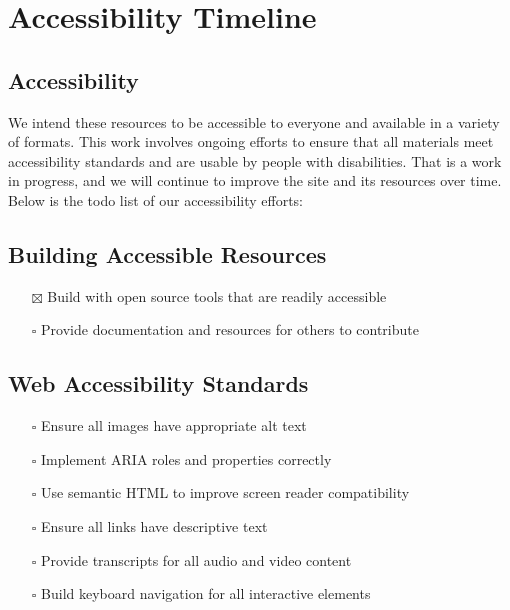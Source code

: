 \section{Accessibility Timeline}\label{accessibility-timeline}

\subsection{Accessibility}\label{accessibility}

We intend these resources to be accessible to everyone and available in
a variety of formats. This work involves ongoing efforts to ensure that
all materials meet accessibility standards and are usable by people with
disabilities. That is a work in progress, and we will continue to
improve the site and its resources over time. Below is the todo list of
our accessibility efforts:

\subsection{Building Accessible
Resources}\label{building-accessible-resources}

\begin{itemize}
\tightlist
\item[$\boxtimes$]
  Build with open source tools that are readily accessible
\item[$\square$]
  Provide documentation and resources for others to contribute
\end{itemize}

\subsection{Web Accessibility
Standards}\label{web-accessibility-standards}

\begin{itemize}
\tightlist
\item[$\square$]
  Ensure all images have appropriate alt text
\item[$\square$]
  Implement ARIA roles and properties correctly
\item[$\square$]
  Use semantic HTML to improve screen reader compatibility
\item[$\square$]
  Ensure all links have descriptive text
\item[$\square$]
  Provide transcripts for all audio and video content
\item[$\square$]
  Build keyboard navigation for all interactive elements
\end{itemize}

